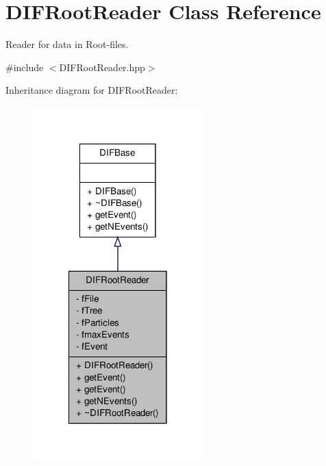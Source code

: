 \hypertarget{classDIFRootReader}{
\section{DIFRootReader Class Reference}
\label{dc/ddc/classDIFRootReader}
}


Reader for data in Root-\/files.  




{\ttfamily \#include $<$DIFRootReader.hpp$>$}



Inheritance diagram for DIFRootReader:
\nopagebreak
\begin{figure}[H]
\begin{center}
\leavevmode
\includegraphics[width=186pt]{dc/db8/classDIFRootReader__inherit__graph}
\end{center}
\end{figure}


